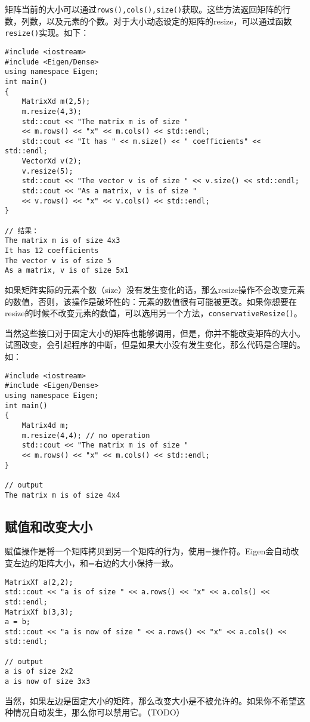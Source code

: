矩阵当前的大小可以通过\verb|rows(),cols(),size()|获取。这些方法返回矩阵的行数，列数，以及元素的个数。对于大小动态设定的矩阵的resize，可以通过函数\verb|resize()|实现。如下：
\begin{lstlisting}[style=Cpp]
#include <iostream>
#include <Eigen/Dense>
using namespace Eigen;
int main()
{
	MatrixXd m(2,5);
	m.resize(4,3);
	std::cout << "The matrix m is of size "
	<< m.rows() << "x" << m.cols() << std::endl;
	std::cout << "It has " << m.size() << " coefficients" << std::endl;
	VectorXd v(2);
	v.resize(5);
	std::cout << "The vector v is of size " << v.size() << std::endl;
	std::cout << "As a matrix, v is of size "
	<< v.rows() << "x" << v.cols() << std::endl;
}

// 结果：
The matrix m is of size 4x3
It has 12 coefficients
The vector v is of size 5
As a matrix, v is of size 5x1
\end{lstlisting}

如果矩阵实际的元素个数（size）没有发生变化的话，那么resize操作不会改变元素的数值，否则，该操作是破坏性的：元素的数值很有可能被更改。如果你想要在resize的时候不改变元素的数值，可以选用另一个方法，\verb|conservativeResize()|。

当然这些接口对于固定大小的矩阵也能够调用，但是，你并不能改变矩阵的大小。试图改变，会引起程序的中断，但是如果大小没有发生变化，那么代码是合理的。如：
\begin{lstlisting}[style=Cpp]
#include <iostream>
#include <Eigen/Dense>
using namespace Eigen;
int main()
{
	Matrix4d m;
	m.resize(4,4); // no operation
	std::cout << "The matrix m is of size "
	<< m.rows() << "x" << m.cols() << std::endl;
}

// output
The matrix m is of size 4x4
\end{lstlisting}

\subsection{ 赋值和改变大小}
赋值操作是将一个矩阵拷贝到另一个矩阵的行为，使用=操作符。Eigen会自动改变左边的矩阵大小，和=右边的大小保持一致。
\begin{lstlisting}[style=Cpp]
MatrixXf a(2,2);
std::cout << "a is of size " << a.rows() << "x" << a.cols() << std::endl;
MatrixXf b(3,3);
a = b;
std::cout << "a is now of size " << a.rows() << "x" << a.cols() << std::endl;

// output
a is of size 2x2
a is now of size 3x3
\end{lstlisting}
当然，如果左边是固定大小的矩阵，那么改变大小是不被允许的。如果你不希望这种情况自动发生，那么你可以禁用它。（TODO）

